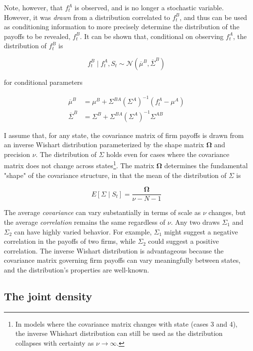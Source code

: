 \documentclass{article}
\begin{document}
Note, however, that $f_t^A$ is observed, and is no longer a stochastic variable. However, it was \textit{drawn} from a distribution correlated to $f_t^B$, and thus can be used as conditioning information to more precisely determine the distribution of the payoffs to be revealed, $f_t^B$. It can be shown  that, conditional on observing $f_t^A$, the distribution of $f_t^B$ is

$$
f_t^B \mid f_t^A, S_t \sim \mathcal{N} (\overline \mu^B, \overline \Sigma^B)
$$

\noindent for conditional parameters

\begin{align*}
    \overline \mu^B &= \mu^B + \Sigma^{BA} (\Sigma^{A})^{-1}(f_t^A - \mu^A)\\
    \overline \Sigma^B &= \Sigma^B + \Sigma^{BA} (\Sigma^{A})^{-1}\Sigma^{AB}
\end{align*}

\newcommand{\Shape}{\mathbf{\Omega}}

I assume that, for any state, the covariance matrix of firm payoffs is drawn from an inverse Wishart distribution parameterized by the shape matrix $\Shape$ and precision $\nu$. The distribution of $\Sigma$ holds even for cases where the covariance matrix does not change across states\footnote{In models where the covariance matrix changes with state (cases 3 and 4), the inverse Whishart distribution can still be used as the distribution collapses with certainty as $\nu \rightarrow \infty$.}. The matrix $\Shape$ determines the fundamental "shape" of the covariance structure, in that the mean of the distribution of $\Sigma$ is 

$$
E[\Sigma \mid S_t] = \frac{\Shape}{\nu - N - 1}
$$

The average \textit{covariance} can vary substantially in terms of scale as $\nu$ changes, but the average \textit{correlation} remains the same regardless of $\nu$. Any two draws $\Sigma_1$ and $\Sigma_2$ can have highly varied behavior. For example, $\Sigma_1$ might suggest a negative correlation in the payoffs of two firms, while $\Sigma_2$ could suggest a positive correlation. The inverse Wishart distribution is advantageous because the covariance matrix governing firm payoffs can vary meaningfully between states, and the distribution's properties are well-known.

\subsection*{The joint density}
\end{document}
